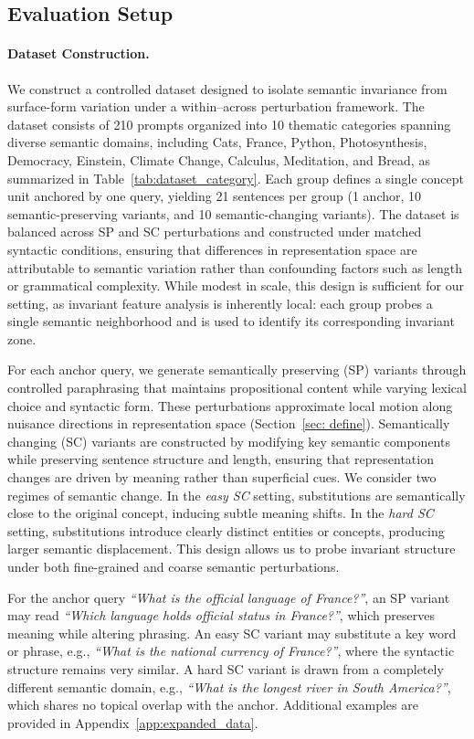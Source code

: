 \subsection{Evaluation Setup}

\paragraph{Dataset Construction.}
We construct a controlled dataset designed to isolate semantic invariance from surface-form variation under a within–across perturbation framework. The dataset consists of 210 prompts organized into 10 thematic categories spanning diverse semantic domains, including Cats, France, Python, Photosynthesis, Democracy, Einstein, Climate Change, Calculus, Meditation, and Bread, as summarized in Table~\ref{tab:dataset_category}. Each group defines a single concept unit anchored by one query, yielding 21 sentences per group (1 anchor, 10 semantic-preserving variants, and 10 semantic-changing variants). The dataset is balanced across SP and SC perturbations and constructed under matched syntactic conditions, ensuring that differences in representation space are attributable to semantic variation rather than confounding factors such as length or grammatical complexity. While modest in scale, this design is sufficient for our setting, as invariant feature analysis is inherently local: each group probes a single semantic neighborhood and is used to identify its corresponding invariant zone.

For each anchor query, we generate semantically preserving (SP) variants through controlled paraphrasing that maintains propositional content while varying lexical choice and syntactic form. These perturbations approximate local motion along nuisance directions in representation space (Section~\ref{sec: define}). 
Semantically changing (SC) variants are constructed by modifying key semantic components while preserving sentence structure and length, ensuring that representation changes are driven by meaning rather than superficial cues. We consider two regimes of semantic change. In the \emph{easy SC} setting, substitutions are semantically close to the original concept, inducing subtle meaning shifts. In the \emph{hard SC} setting, substitutions introduce clearly distinct entities or concepts, producing larger semantic displacement. This design allows us to probe invariant structure under both fine-grained and coarse semantic perturbations.

For the anchor query \emph{``What is the official language of France?''}, an SP variant may read \emph{``Which language holds official status in France?''}, which preserves meaning while altering phrasing. An easy SC variant may substitute a key word or phrase, e.g., \emph{``What is the national currency of France?''}, where the syntactic structure remains very similar. A hard SC variant is drawn from a completely different semantic domain, e.g., \emph{``What is the longest river in South America?''}, which shares no topical overlap with the anchor. Additional examples are provided in Appendix~\ref{app:expanded_data}.


